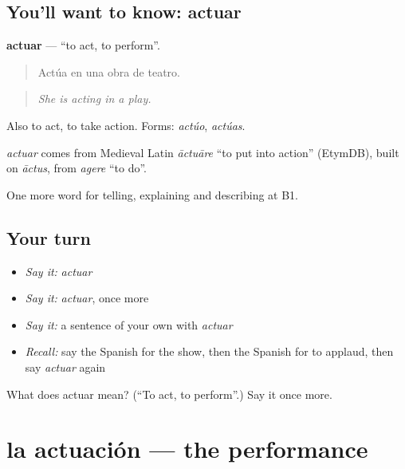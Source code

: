 \subsection*{You'll want to know: actuar}
\textbf{actuar} — \textquotedblleft{}to act, to perform\textquotedblright{}.

\begin{quote}
Actúa en una obra de teatro.
\end{quote}

\begin{quote}
\emph{She is acting in a play.}
\end{quote}

Also to act, to take action. Forms: \emph{actúo}, \emph{actúas}.

\begin{cousinweb}
\emph{actuar} comes from Medieval Latin \emph{āctuāre} \textquotedblleft{}to put into action\textquotedblright{} (EtymDB), built on \emph{āctus}, from \emph{agere} \textquotedblleft{}to do\textquotedblright{}.
\end{cousinweb}

\begin{grammarlens}[title={What you've built}]
One more word for telling, explaining and describing at B1.
\end{grammarlens}

\subsection*{Your turn}
\begin{itemize}
\raggedright
  \item \emph{Say it:} \emph{actuar}
  \item \emph{Say it:} \emph{actuar}, once more
  \item \emph{Say it:} a sentence of your own with \emph{actuar}
  \item \emph{Recall:} say the Spanish for the show, then the Spanish for to applaud, then say \emph{actuar} again
\end{itemize}

\begin{tcolorbox}[breakable,colback=teal!4,colframe=teal!35!black,title={Before you move on}]
What does actuar mean? (\textquotedblleft{}To act, to perform\textquotedblright{}.) Say it once more.
\end{tcolorbox}
\section[la actuación]{la actuación — the performance}

